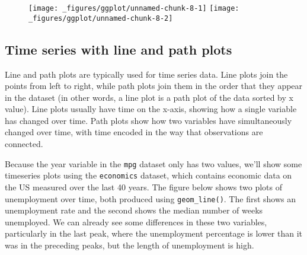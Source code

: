 \begin{Shaded}
\begin{Highlighting}[]
\StringTok{ }\NormalTok{(} \NormalTok{)}
\StringTok{ }\NormalTok{()}
\end{Highlighting}
\end{Shaded}

\begin{figure}[H]
  \texttt{[image: \_figures/ggplot/unnamed-chunk-8-1]}%
  \texttt{[image: \_figures/ggplot/unnamed-chunk-8-2]}
\end{figure}

\subsection{Time series with line and path plots}\label{sub:line}

Line and path plots are typically used for time series data. Line plots
join the points from left to right, while path plots join them in the
order that they appear in the dataset (in other words, a line plot is a
path plot of the data sorted by x value). Line plots usually have time
on the x-axis, showing how a single variable has changed over time. Path
plots show how two variables have simultaneously changed over time, with
time encoded in the way that observations are connected.

Because the year variable in the \texttt{mpg} dataset only has two
values, we'll show some timeseries plots using the \texttt{economics}
dataset, which contains economic data on the US measured over the last
40 years. The figure below shows two plots of unemployment over time,
both produced using \texttt{geom\_line()}. The first shows an
unemployment rate and the second shows the median number of weeks
unemployed. We can already see some differences in these two variables,
particularly in the last peak, where the unemployment percentage is
lower than it was in the preceding peaks, but the length of unemployment
is high.  

\begin{Shaded}
\begin{Highlighting}[]
\StringTok{ }
\StringTok{  }\NormalTok{()}
\StringTok{  }\NormalTok{()}
\end{Highlighting}
\end{Shaded}

